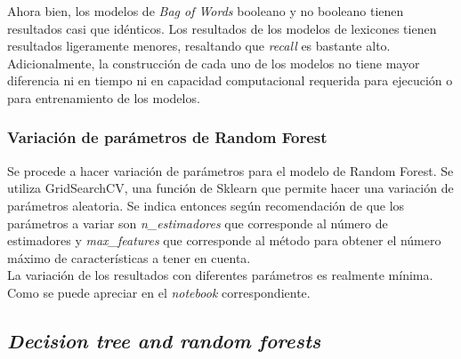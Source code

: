 Ahora bien, los modelos de \textit{Bag of Words} booleano y no booleano tienen resultados casi que idénticos. Los resultados de los modelos de lexicones tienen resultados ligeramente menores, resaltando que \textit{recall} es bastante alto. Adicionalmente, la construcción de cada uno de los modelos no tiene mayor diferencia ni en tiempo ni en capacidad computacional requerida para ejecución o para entrenamiento de los modelos.

\subsubsection{Variación de parámetros de Random Forest}
Se procede a hacer variación de parámetros para el modelo de Random Forest. Se utiliza GridSearchCV, una función de Sklearn que permite hacer una variación de parámetros aleatoria. Se indica entonces según recomendación de \cite{Sklearn-RF} que los parámetros a variar son \textit{n\_estimadores} que corresponde al número de estimadores y \textit{max\_features} que corresponde al método para obtener el número máximo de características a tener en cuenta.\\

La variación de los resultados con diferentes parámetros es realmente mínima. Como se puede apreciar en el \textit{notebook} correspondiente.

\subsection{\textit{Decision tree and random forests}}

